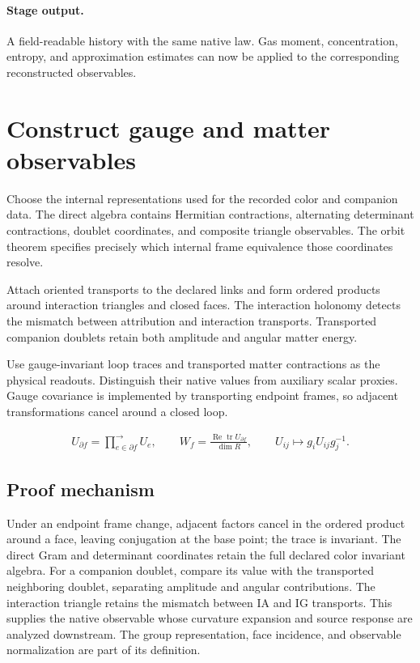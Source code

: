 \documentclass[11pt,a4paper]{article}
\begin{document}
\paragraph{Stage output.} A field-readable history with the same native law. Gas moment, concentration, entropy, and approximation estimates can now be applied to the corresponding reconstructed observables.

\section{Construct gauge and matter observables}
\label{stage:11}
Choose the internal representations used for the recorded color and companion data. The direct algebra contains Hermitian contractions, alternating determinant contractions, doublet coordinates, and composite triangle observables. The orbit theorem specifies precisely which internal frame equivalence those coordinates resolve.

Attach oriented transports to the declared links and form ordered products around interaction triangles and closed faces. The interaction holonomy detects the mismatch between attribution and interaction transports. Transported companion doublets retain both amplitude and angular matter energy.

Use gauge-invariant loop traces and transported matter contractions as the physical readouts. Distinguish their native values from auxiliary scalar proxies. Gauge covariance is implemented by transporting endpoint frames, so adjacent transformations cancel around a closed loop.


\begin{gather*}
U_{\partial f}=\prod_{e\in\partial f}^{\longrightarrow}U_e,\qquad
W_f=\frac{\operatorname{Re}\operatorname{tr}U_{\partial f}}{\dim R},\qquad
U_{ij}\mapsto g_iU_{ij}g_j^{-1}.
\end{gather*}
\subsection*{Proof mechanism}
Under an endpoint frame change, adjacent factors cancel in the ordered product around a face, leaving conjugation at the base point; the trace is invariant. The direct Gram and determinant coordinates retain the full declared color invariant algebra. For a companion doublet, compare its value with the transported neighboring doublet, separating amplitude and angular contributions. The interaction triangle retains the mismatch between IA and IG transports. This supplies the native observable whose curvature expansion and source response are analyzed downstream. The group representation, face incidence, and observable normalization are part of its definition.
\end{document}
